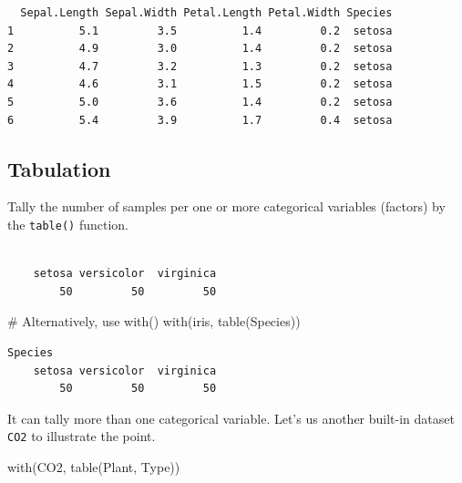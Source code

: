 \documentclass[
  letterpaper,
]{book}
\newenvironment{Shaded}{\begin{snugshade}}{\end{snugshade}}
\newcommand{\CommentTok}[1]{\textcolor[rgb]{0.37,0.37,0.37}{#1}}
\newcommand{\FunctionTok}[1]{\textcolor[rgb]{0.28,0.35,0.67}{#1}}
\newcommand{\NormalTok}[1]{\textcolor[rgb]{0.00,0.23,0.31}{#1}}
\newcommand{\SpecialCharTok}[1]{\textcolor[rgb]{0.37,0.37,0.37}{#1}}
\begin{document}
\begin{verbatim}
  Sepal.Length Sepal.Width Petal.Length Petal.Width Species
1          5.1         3.5          1.4         0.2  setosa
2          4.9         3.0          1.4         0.2  setosa
3          4.7         3.2          1.3         0.2  setosa
4          4.6         3.1          1.5         0.2  setosa
5          5.0         3.6          1.4         0.2  setosa
6          5.4         3.9          1.7         0.4  setosa
\end{verbatim}

\subsection{Tabulation}\label{base-tabulation}

Tally the number of samples per one or more categorical variables
(factors) by the \texttt{table()} function.

\begin{Shaded}
\end{Shaded}

\begin{verbatim}

    setosa versicolor  virginica 
        50         50         50 
\end{verbatim}

\begin{Shaded}
\begin{Highlighting}[]
\CommentTok{\# Alternatively, use with()}
\FunctionTok{with}\NormalTok{(iris, }\FunctionTok{table}\NormalTok{(Species))}
\end{Highlighting}
\end{Shaded}

\begin{verbatim}
Species
    setosa versicolor  virginica 
        50         50         50 
\end{verbatim}

It can tally more than one categorical variable. Let's us another
built-in dataset \texttt{CO2} to illustrate the point.

\begin{Shaded}
\begin{Highlighting}[]
\FunctionTok{with}\NormalTok{(CO2, }\FunctionTok{table}\NormalTok{(Plant, Type))}
\end{Highlighting}
\end{Shaded}
\end{document}
